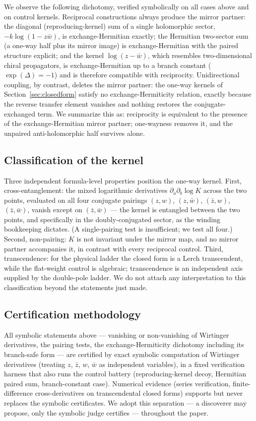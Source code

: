 \documentclass[11pt,a4paper]{article}
\newcommand{\zb}{\bar{z}}
\newcommand{\wb}{\bar{w}}
\begin{document}
We observe the following dichotomy, verified symbolically on all cases above
and on control kernels. Reciprocal constructions always produce the mirror
partner: the diagonal (reproducing-kernel) sum of a single holomorphic sector,
$-k \log(1 - z\wb)$, is exchange-Hermitian exactly; the Hermitian two-sector sum
(a one-way half plus its mirror image) is exchange-Hermitian with the paired
structure explicit; and the kernel $\log(z - \wb)$, which resembles
two-dimensional chiral propagators, is exchange-Hermitian up to a branch
constant ($\exp(\Delta) = -1$) and is therefore compatible with reciprocity.
Unidirectional coupling, by contrast, deletes the mirror partner: the one-way
kernels of Section~\ref{sec:closedform} satisfy no exchange-Hermiticity
relation, exactly because the reverse transfer element vanishes and nothing
restores the conjugate-exchanged term. We summarize this as: reciprocity is
equivalent to the presence of the exchange-Hermitian mirror partner;
one-wayness removes it, and the unpaired anti-holomorphic half survives alone.

\subsection{Classification of the kernel}

Three independent formula-level properties position the one-way kernel. First,
cross-entanglement: the mixed logarithmic derivatives
$\partial_a \partial_b \log K$ across the two points, evaluated on all four
conjugate pairings $(z,w)$, $(z,\wb)$, $(\zb,w)$, $(\zb,\wb)$, vanish except on
$(\zb, \wb)$ --- the kernel is entangled between the two points, and
specifically in the doubly-conjugated sector, as the winding bookkeeping
dictates. (A single-pairing test is insufficient; we test all four.) Second,
non-pairing: $K$ is not invariant under the mirror map, and no mirror partner
accompanies it, in contrast with every reciprocal control. Third,
transcendence: for the physical ladder the closed form is a Lerch transcendent,
while the flat-weight control is algebraic; transcendence is an independent
axis supplied by the double-pole ladder. We do not attach any interpretation to
this classification beyond the statements just made.

\subsection{Certification methodology}

All symbolic statements above --- vanishing or non-vanishing of Wirtinger
derivatives, the pairing tests, the exchange-Hermiticity dichotomy including
its branch-safe form --- are certified by exact symbolic computation of
Wirtinger derivatives (treating $z$, $\zb$, $w$, $\wb$ as independent
variables), in a fixed verification harness that also runs the control battery
(reproducing-kernel decoy, Hermitian paired sum, branch-constant case).
Numerical evidence (series verification, finite-difference cross-derivatives on
transcendental closed forms) supports but never replaces the symbolic
certificates. We adopt this separation --- a discoverer may propose, only the
symbolic judge certifies --- throughout the paper.
\end{document}
